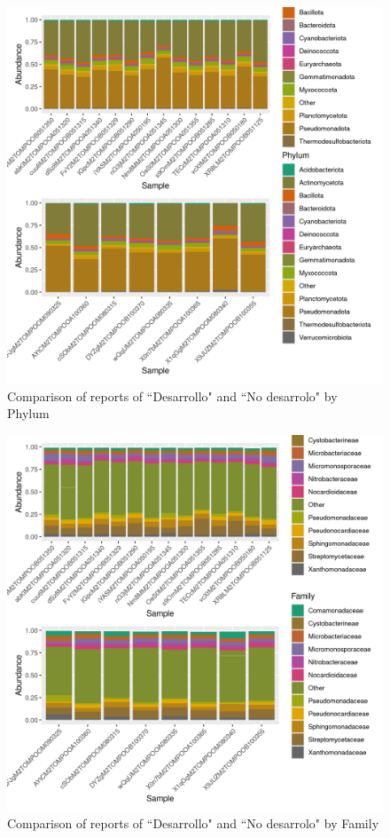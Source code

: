 \documentclass{article}
\begin{document}
\begin{figure}
\centering
\includegraphics[scale=0.8]{tomate_desarrollo.csv_tomate_no_desarrollo.csv_relative_abundance_Phylum.png}
\caption{Comparison of reports of ``Desarrollo" and ``No desarrolo" by Phylum}
\end{figure}


\begin{figure}
\centering
\includegraphics[scale=0.8]{tomate_desarrollo.csv_tomate_no_desarrollo.csv_relative_abundance_Family.png}
\caption{Comparison of reports of ``Desarrollo" and ``No desarrolo" by Family}
\end{figure}
\end{document}
